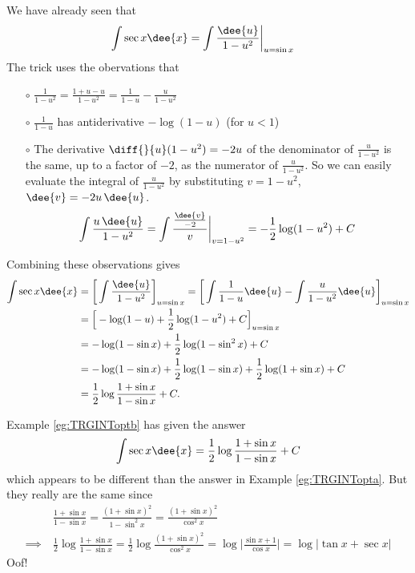 \begin{eg}\label{eg:TRGINToptb}
\soln 
We have already seen that
\begin{align*}
\int \sec x\dee{x}
  &= \int \frac{\dee{u}}{1-u^2}\bigg|_{u=\sin x}
\end{align*}
The trick uses the obervations that
\begin{itemize}\itemsep1pt \parskip0pt  %
\item[$\circ$]
$\frac{1}{1-u^2}=\frac{1+u-u}{1-u^2}=\frac{1}{1-u}-\frac{u}{1-u^2}$
\item[$\circ$] $\frac{1}{1-u}$ has antiderivative $-\log(1-u)$ (for $u<1$)
\item[$\circ$] The derivative $\diff{}{u}(1-u^2)=-2u$ of the denominator of  
$\frac{u}{1-u^2}$ is the same, up to a factor of $-2$, as the numerator of
$\frac{u}{1-u^2}$. So we can easily evaluate the integral of $\frac{u}{1-u^2}$
by substituting $v=1-u^2$, $\dee{v}=-2u\,\dee{u}$.
\begin{align*}
\int \frac{u\,\dee{u}}{1-u^2} 
= \int \frac{\frac{\dee{v}}{-2}}{v}\bigg|_{v=1-u^2}
=-\frac{1}{2}\log(1-u^2)+C
\end{align*}
\end{itemize}
Combining these observations gives
\begin{align*}
\int \sec x\dee{x}
  &=\bigg[\int \frac{\dee{u}}{1-u^2}\bigg]_{u=\sin x}
   =\bigg[\int\frac{1}{1-u}\dee{u}
              -\int\frac{u}{1-u^2}\dee{u}\bigg]_{u=\sin x}\\
  &=\Big[-\log(1-u)+\frac{1}{2}\log(1-u^2)+C\Big]_{u=\sin x}\\
  &=-\log(1-\sin x)+\frac{1}{2}\log(1-\sin^2 x)+C\\
  &=-\log(1-\sin x)+\frac{1}{2}\log(1-\sin x)+\frac{1}{2}\log(1+\sin x)+C\\
  &=\frac{1}{2}\log\frac{1+\sin x}{1-\sin x}+C.
\end{align*}
\end{eg} 

Example \ref{eg:TRGINToptb} has given the answer
\begin{align*}
\int \sec x\dee{x}
   =\frac{1}{2}\log\frac{1+\sin x}{1-\sin x}+C
\end{align*}
which appears to be different than the answer in Example \ref{eg:TRGINTopta}.
But they really are the same since
\begin{align*}
&\frac{1+\sin x}{1-\sin x}
=\frac{(1+\sin x)^2}{1-\sin^2 x}
=\frac{(1+\sin x)^2}{\cos^2 x}\\
\implies\
&\frac{1}{2}\log \frac{1+\sin x}{1-\sin x}
=\frac{1}{2}\log\frac{(1+\sin x)^2}{\cos^2 x}
=\log\Big|\frac{\sin x+1}{\cos x}\Big|
=\log|\tan x+\sec x|
\end{align*}
Oof!

